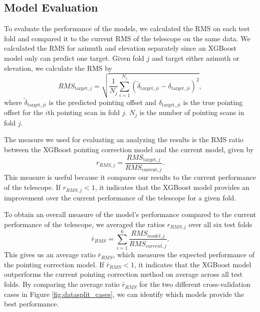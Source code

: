 \subsection{Model Evaluation}
To evaluate the performance of the models, we calculated the RMS on each test fold and compared it to the current RMS of the telescope on the same data.
We calculated the RMS for azimuth and elevation separately since an XGBoost model only can predict one target.
Given fold $j$ and target either azimuth or elevation, we calculate the RMS by
\begin{equation}
    RMS_{\text{target},j} = \sqrt{\frac{1}{N_j}\sum_{i=1}^{N_j} (\tilde{\delta}_{\text{target},ji} - \delta_{\text{target},ji})^2},
\end{equation}
where $\tilde{\delta}_{\text{target},ji}$ is the predicted pointing offset and $\delta_{\text{target},ji}$ is the true pointing offset for the $i$th pointing scan in fold $j$.
$N_j$ is the number of pointing scans in fold $j$. 

The measure we used for evaluating an analyzing the results is the RMS ratio between the XGBoost pointing correction model and the current model, given by
\begin{equation}\label{eq:rms_compared}
    r_{RMS,j} = \frac{RMS_{\text{target},j}}{RMS_{\text{current},j}}.
\end{equation}
This measure is useful because it compares our results to the current performance of the telescope.
If $r_{RMS,j}<1$, it indicates that the XGBoost model provides an improvement over the current performance of the telescope for a given fold.

To obtain an overall measure of the model's performance compared to the current performance of the telescope, we averaged the ratios $r_{RMS,j}$ over all six test folds
\begin{equation} \label{eq:mean_rms_compared}
    \bar{r}_{RMS} = \sum_{i=1}^6 \frac{RMS_{model,j}}{RMS_{current,j}}.
\end{equation}
This gives us an average ratio $\bar{r}_{RMS}$, which measures the expected performance of the pointing correction model.
If $\bar{r}_{RMS} < 1$, it indicates that the XGBoost model outperforms the current pointing correction method on average across all test folds.
By comparing the average ratio $\bar{r}_{RMS}$ for the two different cross-validation cases in Figure \ref{fig:datasplit_cases},
we can identify which models provide the best performance.



